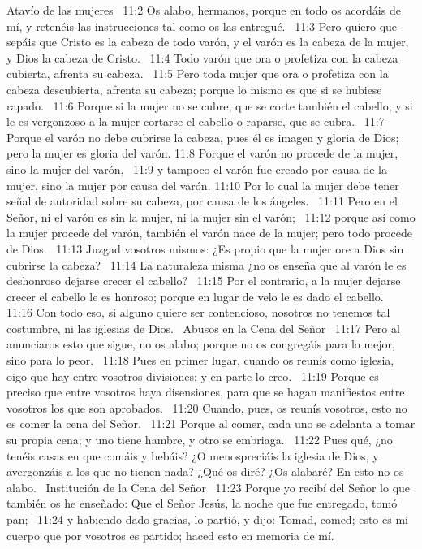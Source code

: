 Atavío de las mujeres  
11:2 Os alabo, hermanos, porque en todo os acordáis de mí, y retenéis las instrucciones tal como os las entregué.  
11:3 Pero quiero que sepáis que Cristo es la cabeza de todo varón, y el varón es la cabeza de la mujer, y Dios la cabeza de Cristo.  
11:4 Todo varón que ora o profetiza con la cabeza cubierta, afrenta su cabeza.  
11:5 Pero toda mujer que ora o profetiza con la cabeza descubierta, afrenta su cabeza; porque lo mismo es que si se hubiese rapado.  
11:6 Porque si la mujer no se cubre, que se corte también el cabello; y si le es vergonzoso a la mujer cortarse el cabello o raparse, que se cubra.  
11:7 Porque el varón no debe cubrirse la cabeza, pues él es imagen y gloria de Dios; pero la mujer es gloria del varón. 
11:8 Porque el varón no procede de la mujer, sino la mujer del varón,  
11:9 y tampoco el varón fue creado por causa de la mujer, sino la mujer por causa del varón. 
11:10 Por lo cual la mujer debe tener señal de autoridad sobre su cabeza, por causa de los ángeles.  
11:11 Pero en el Señor, ni el varón es sin la mujer, ni la mujer sin el varón;  
11:12 porque así como la mujer procede del varón, también el varón nace de la mujer; pero todo procede de Dios.  
11:13 Juzgad vosotros mismos: ¿Es propio que la mujer ore a Dios sin cubrirse la cabeza?  
11:14 La naturaleza misma ¿no os enseña que al varón le es deshonroso dejarse crecer el cabello?  
11:15 Por el contrario, a la mujer dejarse crecer el cabello le es honroso; porque en lugar de velo le es dado el cabello.  
11:16 Con todo eso, si alguno quiere ser contencioso, nosotros no tenemos tal costumbre, ni las iglesias de Dios.  
Abusos en la Cena del Señor  
11:17 Pero al anunciaros esto que sigue, no os alabo; porque no os congregáis para lo mejor, sino para lo peor.  
11:18 Pues en primer lugar, cuando os reunís como iglesia, oigo que hay entre vosotros divisiones; y en parte lo creo.  
11:19 Porque es preciso que entre vosotros haya disensiones, para que se hagan manifiestos entre vosotros los que son aprobados.  
11:20 Cuando, pues, os reunís vosotros, esto no es comer la cena del Señor.  
11:21 Porque al comer, cada uno se adelanta a tomar su propia cena; y uno tiene hambre, y otro se embriaga.  
11:22 Pues qué, ¿no tenéis casas en que comáis y bebáis? ¿O menospreciáis la iglesia de Dios, y avergonzáis a los que no tienen nada? ¿Qué os diré? ¿Os alabaré? En esto no os alabo.  
Institución de la Cena del Señor   
11:23 Porque yo recibí del Señor lo que también os he enseñado: Que el Señor Jesús, la noche que fue entregado, tomó pan;  
11:24 y habiendo dado gracias, lo partió, y dijo: Tomad, comed; esto es mi cuerpo que por vosotros es partido; haced esto en memoria de mí.  
